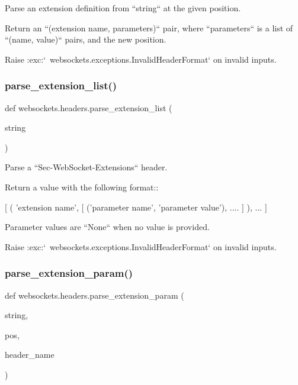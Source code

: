 \begin{DoxyVerb}Parse an extension definition from ``string`` at the given position.

Return an ``(extension name, parameters)`` pair, where ``parameters`` is a
list of ``(name, value)`` pairs, and the new position.

Raise :exc:`~websockets.exceptions.InvalidHeaderFormat` on invalid inputs.\end{DoxyVerb}
 \mbox{\label{namespacewebsockets_1_1headers_a9e8033055d7efda10834d20e1b3cd141}} 
\subsubsection{\texorpdfstring{parse\+\_\+extension\+\_\+list()}{parse\_extension\_list()}}
{\footnotesize\ttfamily def websockets.\+headers.\+parse\+\_\+extension\+\_\+list (\begin{DoxyParamCaption}\item[{}]{string }\end{DoxyParamCaption})}

\begin{DoxyVerb}Parse a ``Sec-WebSocket-Extensions`` header.

Return a value with the following format::

    [
        (
            'extension name',
            [
                ('parameter name', 'parameter value'),
                ....
            ]
        ),
        ...
    ]

Parameter values are ``None`` when no value is provided.

Raise :exc:`~websockets.exceptions.InvalidHeaderFormat` on invalid inputs.\end{DoxyVerb}
 \mbox{\label{namespacewebsockets_1_1headers_a777254dc2f4beda6277896d1230b161b}} 
\subsubsection{\texorpdfstring{parse\+\_\+extension\+\_\+param()}{parse\_extension\_param()}}
{\footnotesize\ttfamily def websockets.\+headers.\+parse\+\_\+extension\+\_\+param (\begin{DoxyParamCaption}\item[{}]{string,  }\item[{}]{pos,  }\item[{}]{header\+\_\+name }\end{DoxyParamCaption})}

